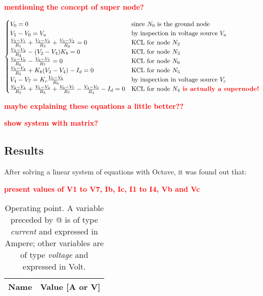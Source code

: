 \par
\textcolor{red}{\textbf{mentioning the concept of super node?}}



\begin{equation}
\begin{cases}
V_0 = 0 & \mbox{since $N_0$ is the ground node} \\
V_1-V_0 = V_a & \mbox{by inspection in voltage source $V_a$}  \\
\frac{V_2-V_1}{R_1} + \frac{V_2-V_4}{R_3} + \frac{V_3-V_2}{R_2} = 0 & \mbox{KCL for node $N_2$} \\
\frac{V_3-V_2}{R_2} - (V_2-V_4) K_b = 0 & \mbox{KCL for node $N_3$} \\
\frac{V_0-V_6}{R_6} - \frac{V_6-V_7}{R_7} = 0 & \mbox{KCL for node $N_6$}\\
\frac{V_5-V_4}{R_5} + K_b (V_2 - V_4) - I_d = 0 & \mbox{KCL for node $N_5$}\\
V_4-V_7 = K_c \frac{V_0-V_6}{R_6} & \mbox{by inspection in voltage source $V_c$} \\
\frac{V_2-V_4}{R_3} + \frac{V_5-V_4}{R_5} + \frac{V_6-V_7}{R_7} - \frac{V_4-V_0}{R_4} - I_d = 0 & \mbox{KCL for node $N_4$} \textcolor{red}{\textbf{     is actually a supernode!}}
\end{cases}
\end{equation}

\par
\textcolor{red}{\textbf{maybe explaining these equations a little better??}}
\par
\textcolor{red}{\textbf{show system with matrix?}}






\subsection{Results}
\par
After solving a linear system of equations with Octave, it was found out that:
\par
\textcolor{red}{\textbf{present values of V1 to V7, Ib, Ic, I1 to I4, Vb and Vc}}


\begin{table}[h]
  \centering
  \begin{tabular}{|c|c|}
    \hline    
    {\bf Name} & {\bf Value [A or V]} \\ \hline
    
  \end{tabular}
  \caption{Operating point. A variable preceded by @ is of type {\em current}
    and expressed in Ampere; other variables are of type {\it voltage} and expressed in
    Volt.}
  \label{tab:op}
\end{table}

